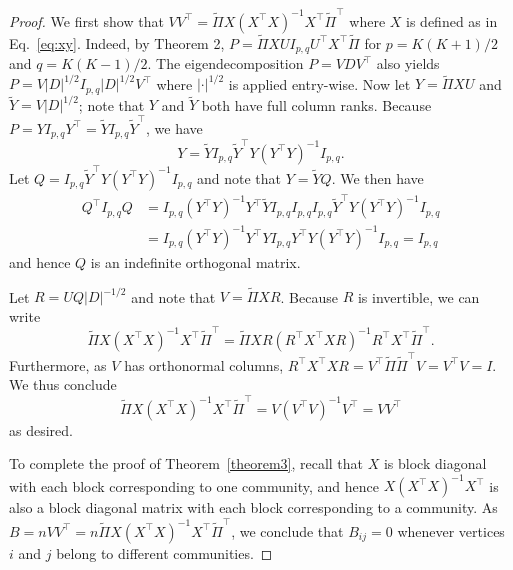 \documentclass[12pt]{article}
\begin{document}
\begin{proof}
We first show that $V V^\top =
\tilde{\Pi} X (X^\top X)^{-1} X^\top \tilde{\Pi}^{\top} $ where $X$ is 
defined as in Eq.~\eqref{eq:xy}. Indeed, by Theorem 2, 
\(P = \tilde{\Pi} X U I_{p, q} U^\top X^\top \tilde{\Pi}\) for $p = K(K+1)/2$ and $q = K(K-1)/2$. 
The eigendecomposition \(P = V D V^\top\) also yields $P = V
|D|^{1/2} I_{p, q} |D|^{1/2} V^\top$ where \(|\cdot|^{1/2}\) is
applied entry-wise. Now let $Y = \tilde{\Pi} XU$ and $\tilde{Y} = V|D|^{1/2}$; note that
$Y$ and $\tilde{Y}$ both have full column ranks. 
Because $P = Y I_{p,q} Y^{\top} = \tilde{Y} I_{p,q} \tilde{Y}^{\top}$, we have
$$Y = \tilde{Y} I_{p,q} \tilde{Y}^{\top} Y (Y^{\top} Y)^{-1} I_{p,q}.$$
Let $Q = I_{p,q} \tilde{Y}^{\top} Y (Y^{\top} Y)^{-1} I_{p,q}$ and note that
$Y = \tilde{Y} Q$. We then have
\begin{equation*}
  \begin{split}
  Q^{\top} I_{p,q} Q &= I_{p,q} (Y^{\top} Y)^{-1} Y^{\top} \tilde{Y} I_{p,q}
I_{p,q} I_{p,q} \tilde{Y}^{\top} Y (Y^{\top} Y)^{-1} I_{p,q} \\ &= I_{p,q} (Y^{\top} Y)^{-1} Y^{\top} Y I_{p,q}
Y^{\top} Y (Y^{\top} Y)^{-1} I_{p,q} =  I_{p,q}
\end{split}
\end{equation*}
and hence $Q$ is an indefinite orthogonal matrix. 

Let $R = U Q |D|^{-1/2}$ and note that $V = \tilde{\Pi} XR$. Because $R$ is
invertible, we can write
$$\tilde{\Pi} X (X^{\top} X)^{-1} X^{\top} \tilde{\Pi}^{\top} =
\tilde{\Pi} X R (R^{\top} X^{\top} X R)^{-1}
R^{\top} X^{\top} \tilde{\Pi}^{\top}.$$ 
Furthermore, as $V$ has orthonormal columns, $R^{\top} X^{\top} X R =
V^{\top} \tilde{\Pi} \tilde{\Pi}^{\top} V = V^{\top} V = I$. We thus conclude
$$\tilde{\Pi} X (X^{\top} X)^{-1} X^{\top} \tilde{\Pi}^{\top} = V (V^{\top} V)^{-1} V^{\top} = V V^{\top}$$
as desired.

To complete the proof of Theorem~\ref{theorem3}, recall that \(X\) 
is block diagonal with each block corresponding to one community, 
and hence \(X (X^\top X)^{-1} X^\top\) is also a
block diagonal matrix with each block corresponding to a community. 
As $B = n VV^{\top} = n \tilde{\Pi} X (X^\top X)^{-1} X^\top \tilde{\Pi}^{\top}$, 
we conclude that $B_{ij} = 0$ 
whenever vertices $i$ and $j$ belong to different communities.  
\end{proof}
\end{document}
